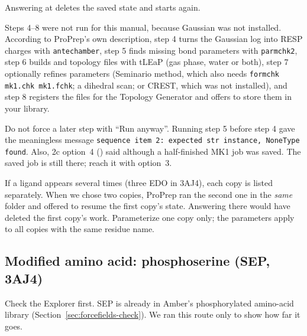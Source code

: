 Answering  at  deletes the saved state
and starts again.

\begin{needsoftware}
Steps 4--8 were not run for this manual, because Gaussian was not installed.
According to ProPrep's own description, step 4 turns the Gaussian log into
RESP charges with \texttt{antechamber}, step 5 finds missing bond parameters
with \texttt{parmchk2}, step 6 builds  and topology files with
tLEaP (gas phase, water or both), step 7 optionally refines parameters
(Seminario method, which also needs \texttt{formchk mk1.chk mk1.fchk}; a
dihedral scan; or CREST, which was not installed), and step 8 registers the
files for the Topology Generator and offers to store them in your library.
\end{needsoftware}

\begin{watchout}
Do not force a later step with ``Run anyway''. Running step 5 before step 4
gave the meaningless message
\texttt{sequence item 2: expected str instance, NoneType found}. Also, 2c
option~4 () said
 although a half-finished MK1
job was saved. The saved job is still there; reach it with option~3.
\end{watchout}

\begin{watchout}
If a ligand appears several times (three EDO in 3AJ4), each copy is listed
separately. When we chose two copies, ProPrep ran the second one in the
\emph{same} folder and offered to resume the first copy's state. Answering
 there would have deleted the first copy's work. Parameterize one copy
only; the parameters apply to all copies with the same residue name.
\end{watchout}

\subsection{Modified amino acid: phosphoserine (SEP, 3AJ4)}
\label{sec:forcefields-modaa}

\begin{tip}
Check the Explorer first. SEP is already in Amber's phosphorylated
amino-acid library (Section~\ref{sec:forcefields-check}). We ran this route
only to show how far it goes.
\end{tip}

